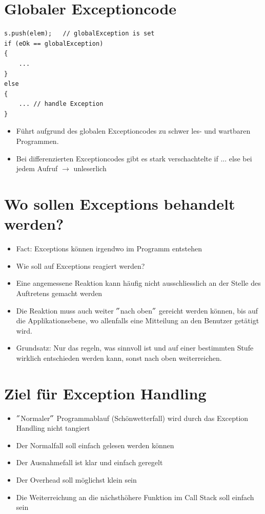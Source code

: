 \section{Globaler Exceptioncode}
\begin{multicols}{2}
\begin{minipage}{\linewidth}
\vspace{-2\baselineskip}
\begin{lstlisting}
s.push(elem);	// globalException is set
if (eOk == globalException)
{
	...
}
else
{
	... // handle Exception
}
\end{lstlisting}	
\end{minipage}
\vfill\null
\columnbreak
\begin{itemize}
	\item Führt aufgrund des globalen Exceptioncodes zu schwer les- und wartbaren Programmen.
	\item Bei differenzierten Exceptioncodes gibt es stark verschachtelte if ... else bei jedem Aufruf $\rightarrow$ unleserlich
\end{itemize}
\end{multicols}

\section{Wo sollen Exceptions behandelt werden?}
\begin{itemize}
	\item Fact: Exceptions können irgendwo im Programm entstehen
	\item Wie soll auf Exceptions reagiert werden?
	\item Eine angemessene Reaktion kann häufig nicht ausschliesslich an der Stelle des Auftretens gemacht werden
	\item Die Reaktion muss auch weiter $"$nach oben$"$ gereicht werden können, bis auf die Applikationsebene, wo allenfalls eine Mitteilung an den Benutzer getätigt wird.
	\item[\-] \begin{hinweis}
		Grundsatz: Nur das regeln, was sinnvoll ist und auf einer bestimmten Stufe wirklich entschieden werden kann, sonst nach oben weiterreichen.
	\end{hinweis}
\end{itemize}

\section{Ziel für Exception Handling}
\begin{itemize}
	\item $"$Normaler$"$ Programmablauf (Schönwetterfall) wird durch das Exception Handling nicht tangiert
	\item Der Normalfall soll einfach gelesen werden können
	\item Der Ausnahmefall ist klar und einfach geregelt
	\item Der Overhead soll möglichst klein sein
	\item Die Weiterreichung an die nächsthöhere Funktion im Call Stack soll einfach sein
\end{itemize}

